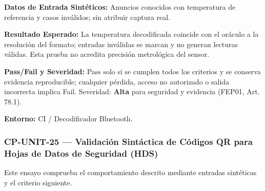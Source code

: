 \par\noindent\textbf{Datos de Entrada Sintéticos:} Anuncios conocidos con temperatura de referencia y casos inválidos; sin atribuir captura real.\par
\par\noindent\textbf{Resultado Esperado:} La temperatura decodificada coincide con el oráculo a la resolución del formato; entradas inválidas se marcan y no generan lecturas válidas. Esta prueba no acredita precisión metrológica del sensor.\par
\par\noindent\textbf{Pass/Fail y Severidad:} Pass solo si se cumplen todos los criterios y se conserva evidencia reproducible; cualquier pérdida, acceso no autorizado o salida incorrecta implica Fail. Severidad: \textbf{Alta} para seguridad y evidencia (FEP01, Art. 78.1).\par
\par\noindent\textbf{Entorno:} CI / Decodificador Bluetooth.\par


\subsubsection*{CP-UNIT-25 — Validación Sintáctica de Códigos QR para Hojas de Datos de Seguridad (HDS)}\label{sec:9-cp-unit-25}
Este ensayo comprueba el comportamiento descrito mediante entradas sintéticas y el criterio siguiente.

